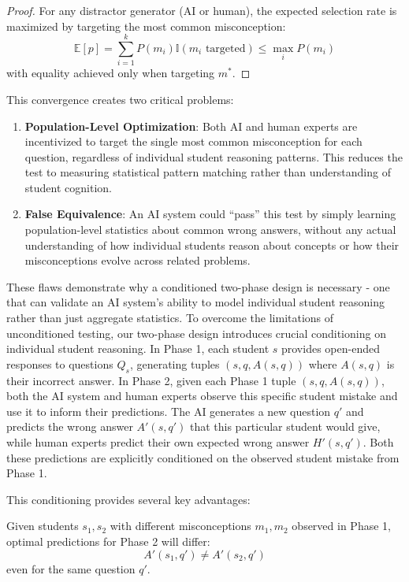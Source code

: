 \begin{proof}
For any distractor generator (AI or human), the expected selection rate is maximized by targeting the most common misconception:
\[\mathbb{E}[p] = \sum_{i=1}^k P(m_i)\mathbb{I}(m_i \text{ targeted}) \leq \max_{i} P(m_i)\]
with equality achieved only when targeting $m^*$.
\end{proof}

This convergence creates two critical problems:

\begin{enumerate}
   \item \textbf{Population-Level Optimization}: Both AI and human experts are incentivized to target the single most common misconception for each question, regardless of individual student reasoning patterns. This reduces the test to measuring statistical pattern matching rather than understanding of student cognition.
   
   \item \textbf{False Equivalence}: An AI system could ``pass'' this test by simply learning population-level statistics about common wrong answers, without any actual understanding of how individual students reason about concepts or how their misconceptions evolve across related problems.
\end{enumerate}

These flaws demonstrate why a conditioned two-phase design is necessary - one that can validate an AI system's ability to model individual student reasoning rather than just aggregate statistics. To overcome the limitations of unconditioned testing, our two-phase design introduces crucial conditioning on individual student reasoning. In Phase 1, each student $s$ provides open-ended responses to questions $Q_s$, generating tuples $(s,q,A(s,q))$ where $A(s,q)$ is their incorrect answer. In Phase 2, given each Phase 1 tuple $(s,q,A(s,q))$, both the AI system and human experts observe this specific student mistake and use it to inform their predictions. The AI generates a new question $q'$ and predicts the wrong answer $A'(s,q')$ that this particular student would give, while human experts predict their own expected wrong answer $H'(s,q')$. Both these predictions are explicitly conditioned on the observed student mistake from Phase 1.


This conditioning provides several key advantages:

\begin{theorem}
Given students $s_1, s_2$ with different misconceptions $m_1, m_2$ observed in Phase 1, optimal predictions for Phase 2 will differ:
\[A'(s_1,q') \neq A'(s_2,q')\]
even for the same question $q'$.
\end{theorem}

